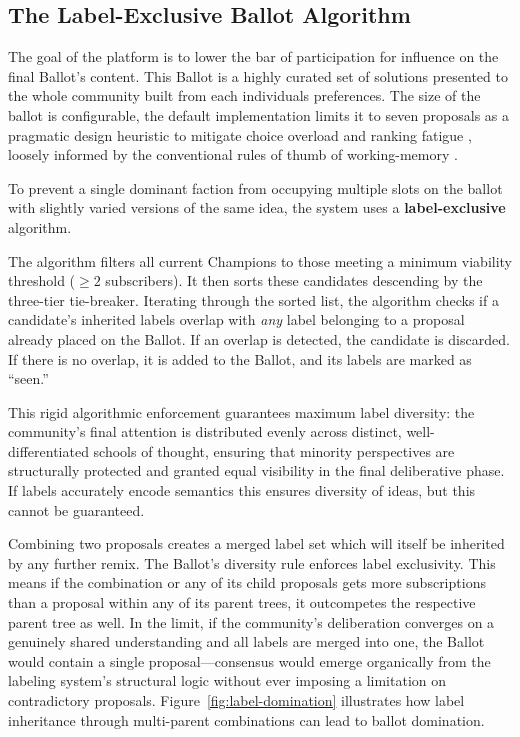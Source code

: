 \documentclass[a4paper, 12pt, twoside]{iviathesis}
\begin{document}
\subsection{The Label-Exclusive Ballot Algorithm}
\label{sec:ballot-algorithm}
The goal of the platform is to lower the bar of participation for influence on the final Ballot's content. This Ballot is a highly curated set of solutions presented to the whole community built from each individuals preferences. The size of the ballot is configurable, the default implementation limits it to seven proposals as a pragmatic design heuristic to mitigate choice overload and ranking fatigue \cite{iyengar2000choice}, loosely informed by the conventional rules of thumb of working-memory \cite{miller1956}.

To prevent a single dominant faction from occupying multiple slots on the ballot with slightly varied versions of the same idea, the system uses a \textbf{label-exclusive} algorithm. 

The algorithm filters all current Champions to those meeting a minimum viability threshold ($\ge 2$ subscribers). It then sorts these candidates descending by the three-tier tie-breaker. Iterating through the sorted list, the algorithm checks if a candidate's inherited labels overlap with \textit{any} label belonging to a proposal already placed on the Ballot. If an overlap is detected, the candidate is discarded. If there is no overlap, it is added to the Ballot, and its labels are marked as ``seen.''

This rigid algorithmic enforcement guarantees maximum label diversity: the community's final attention is distributed evenly across distinct, well-differentiated schools of thought, ensuring that minority perspectives are structurally protected and granted equal visibility in the final deliberative phase. If labels accurately encode semantics this ensures diversity of ideas, but this cannot be guaranteed.

Combining two proposals creates a merged label set which will itself be inherited by any further remix. 
The Ballot's diversity rule enforces label exclusivity. This means if the combination or any of its child proposals gets more subscriptions than a proposal within any of its parent trees, it outcompetes the respective parent tree as well. 
In the limit, if the community's deliberation converges on a genuinely shared understanding and all labels are merged into one, the Ballot would contain a single proposal---consensus would emerge organically from the labeling system's structural logic without ever imposing a limitation on contradictory proposals. Figure~\ref{fig:label-domination} illustrates how label inheritance through multi-parent combinations can lead to ballot domination.
\end{document}
